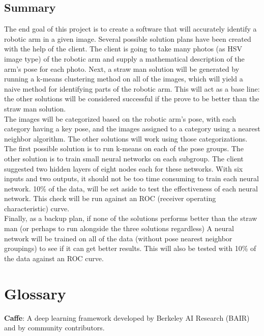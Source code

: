 \documentclass[10pt,journal,compsoc, draftclsnofoot,onecolumn]{IEEEtran}
\begin{document}
\subsection{Summary}
The end goal of this project is to create a software that will accurately identify a robotic arm in a given image. Several possible solution plans have been created with the help of the client. The client is going to take many photos (as HSV image type) of the robotic arm and supply a mathematical description of the arm's pose for each photo. Next, a straw man solution will be generated by running a k-means clustering method on all of the images, which will yield a naive method for identifying parts of the robotic arm. This will act as a base line: the other solutions will be considered successful if the prove to be better than the straw man solution. \\

\noindent
The images will be categorized based on the robotic arm's pose, with each category having a key pose, and the images assigned to a category using a nearest neighbor algorithm. The other solutions will work using those categorizations. \\

\noindent
The first possible solution is to run k-means on each of the pose groups. The other solution is to train small neural networks on each subgroup. The client suggested two hidden layers of eight nodes each for these networks. With six inputs and two outputs, it should not be too time consuming to train each neural network. 10\% of the data, will be set aside to test the effectiveness of each neural network. This check will be run against an ROC (receiver operating characteristic) curve. \\

\noindent
Finally, as a backup plan, if none of the solutions performs better than the straw man (or perhaps to run alongside the three solutions regardless) A neural network will be trained on all of the data (without pose nearest neighbor groupings) to see if it can get better results. This will also be tested with 10\% of the data against an ROC curve.



\section{Glossary}
\noindent \textbf{Caffe}: A deep learning framework developed by Berkeley AI Research (BAIR) and by community contributors. \\
\end{document}
